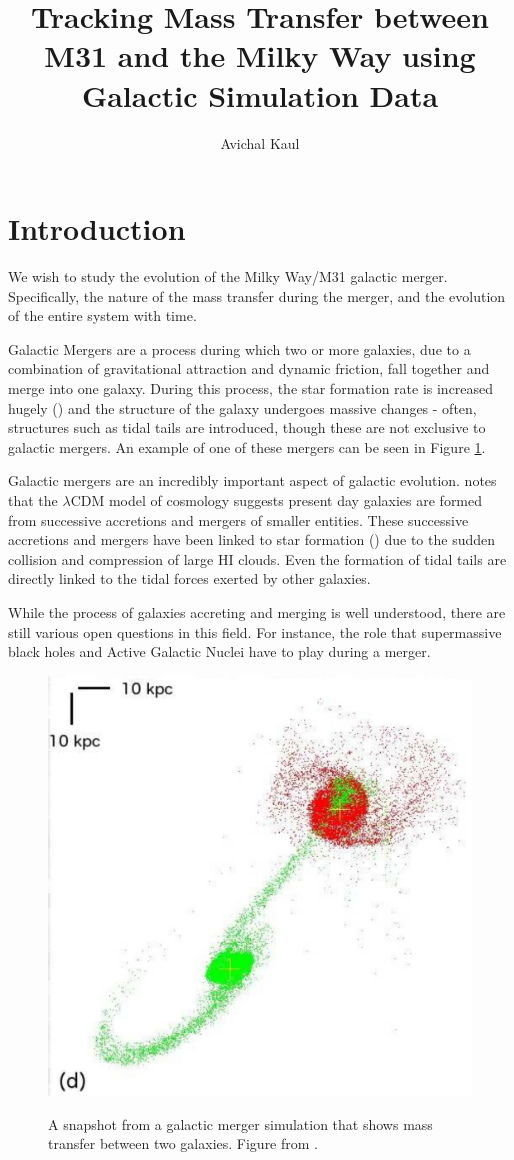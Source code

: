 \documentclass[linenumbers]{aastex631} %
\begin{document}
\title{Tracking Mass Transfer between M31 and the Milky Way using Galactic Simulation Data}


\author{Avichal Kaul}


\section{Introduction}

We wish to study the evolution of the Milky Way/M31 galactic merger. Specifically, the nature of the mass transfer during the merger, and the evolution of the entire system with time. 

Galactic Mergers are a process during which two or more galaxies, due to a combination of gravitational attraction and dynamic friction, fall together and merge into one galaxy. During this process, the star formation rate is increased hugely (\cite{Moster_2011}) and the structure of the galaxy undergoes massive changes - often, structures such as tidal tails are introduced, though these are not exclusive to galactic mergers. An example of one of these mergers can be seen in Figure \ref{fig:Privon image}.


Galactic mergers are an incredibly important aspect of galactic evolution. \cite{1978MNRAS.183..341W} notes that the $\lambda\text{CDM}$ model of cosmology suggests present day galaxies are formed from successive accretions and mergers of smaller entities. These successive accretions and mergers have been linked to star formation (\cite{Barnes_2004}) due to the sudden collision and compression of large HI clouds. Even the formation of tidal tails  are directly linked to the tidal forces exerted by other galaxies.

While the process of galaxies accreting and merging is well understood, there are still various open questions in this field. For instance, the role that supermassive black holes and Active Galactic Nuclei have to play during a merger.

\begin{figure}
    \centering
    \includegraphics[width = 0.5\linewidth]{page08_1.jpg}
    \label{fig:Privon image}
    \caption{A snapshot from a galactic merger simulation that shows mass transfer between two galaxies. Figure from \cite{Privon_2013}.}
\end{figure}
\end{document}
